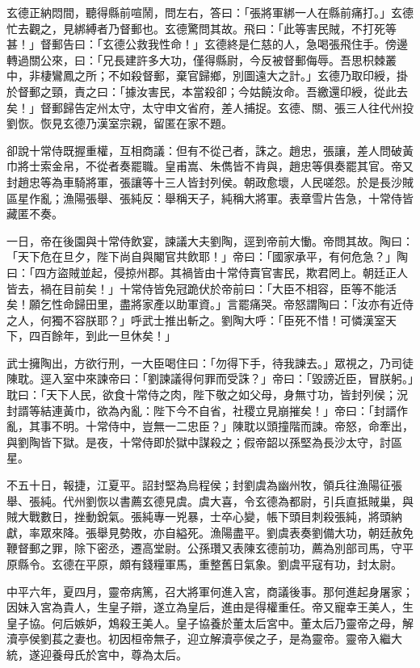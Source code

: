 玄德正納悶間，聽得縣前喧鬧，問左右，答曰：「張將軍綁一人在縣前痛打。」玄德忙去觀之，見綁縛者乃督郵也。玄德驚問其故。飛曰：「此等害民賊，不打死等甚！」督郵告曰：「玄德公救我性命！」玄德終是仁慈的人，急喝張飛住手。傍邊轉過關公來，曰：「兄長建許多大功，僅得縣尉，今反被督郵侮辱。吾思枳棘叢中，非棲鸞鳳之所；不如殺督郵，棄官歸鄉，別圖遠大之計。」玄德乃取印綬，掛於督郵之頸，責之曰：「據汝害民，本當殺卻；今姑饒汝命。吾繳還印綬，從此去矣！」督郵歸告定州太守，太守申文省府，差人捕捉。玄德、關、張三人往代州投劉恢。恢見玄德乃漢室宗親，留匿在家不題。

卻說十常侍既握重權，互相商議：但有不從己者，誅之。趙忠，張讓，差人問破黃巾將士索金帛，不從者奏罷職。皇甫嵩、朱儁皆不肯與，趙忠等俱奏罷其官。帝又封趙忠等為車騎將軍，張讓等十三人皆封列侯。朝政愈壞，人民嗟怨。於是長沙賊區星作亂；漁陽張舉、張純反：舉稱天子，純稱大將軍。表章雪片告急，十常侍皆藏匿不奏。

一日，帝在後園與十常侍飲宴，諫議大夫劉陶，逕到帝前大慟。帝問其故。陶曰：「天下危在旦夕，陛下尚自與閹官共飲耶！」帝曰：「國家承平，有何危急？」陶曰：「四方盜賊並起，侵掠州郡。其禍皆由十常侍賣官害民，欺君罔上。朝廷正人皆去，禍在目前矣！」十常侍皆免冠跪伏於帝前曰：「大臣不相容，臣等不能活矣！願乞性命歸田里，盡將家產以助軍資。」言罷痛哭。帝怒謂陶曰：「汝亦有近侍之人，何獨不容朕耶？」呼武士推出斬之。劉陶大呼：「臣死不惜！可憐漢室天下，四百餘年，到此一旦休矣！」

武士擁陶出，方欲行刑，一大臣喝住曰：「勿得下手，待我諫去。」眾視之，乃司徒陳耽。逕入室中來諫帝曰：「劉諫議得何罪而受誅？」帝曰：「毀謗近臣，冒朕躬。」耽曰：「天下人民，欲食十常侍之肉，陛下敬之如父母，身無寸功，皆封列侯；況封諝等結連黃巾，欲為內亂：陛下今不自省，社稷立見崩摧矣！」帝曰：「封諝作亂，其事不明。十常侍中，豈無一二忠臣？」陳耽以頭撞階而諫。帝怒，命牽出，與劉陶皆下獄。是夜，十常侍即於獄中謀殺之；假帝韶以孫堅為長沙太守，討區星。

不五十日，報捷，江夏平。詔封堅為烏程侯；封劉虞為幽州牧，領兵往漁陽征張舉、張純。代州劉恢以書薦玄德見虞。虞大喜，令玄德為都尉，引兵直抵賊巢，與賊大戰數日，挫動銳氣。張純專一兇暴，士卒心變，帳下頭目刺殺張純，將頭納獻，率眾來降。張舉見勢敗，亦自縊死。漁陽盡平。劉虞表奏劉備大功，朝廷赦免鞭督郵之罪，除下密丞，遷高堂尉。公孫瓚又表陳玄德前功，薦為別部司馬，守平原縣令。玄德在平原，頗有錢糧軍馬，重整舊日氣象。劉虞平寇有功，封太尉。

中平六年，夏四月，靈帝病篤，召大將軍何進入宮，商議後事。那何進起身屠家；因妹入宮為貴人，生皇子辯，遂立為皇后，進由是得權重任。帝又寵幸王美人，生皇子協。何后嫉妒，鴆殺王美人。皇子協養於董太后宮中。董太后乃靈帝之母，解瀆亭侯劉萇之妻也。初因桓帝無子，迎立解瀆亭侯之子，是為靈帝。靈帝入繼大統，遂迎養母氏於宮中，尊為太后。

